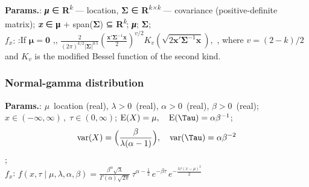    {\color{darkblue} \textbf{Params.}:} {\textbf{\textit{μ}} ∈ \textbf{R}\textsuperscript{\textit{k}} — location, \textbf{Σ} ∈ \textbf{R}\textsuperscript{\textit{k×k}} — covariance (positive-definite matrix)}; {\textbf{\textit{x}} ∈ \textbf{μ} + span(\textbf{Σ}) ⊆ \textbf{R}\textsuperscript{\textit{k}}}; {\textbf{\textit{μ}}}; {\textbf{Σ}};\hspace{0.5cm}\\{\color{darkblue} \textbf{$f_x$}:} {:If $\boldsymbol\mu = \mathbf{0}$ ,,  $\frac 2 {(2\pi)^{k/2} |\boldsymbol\Sigma|^{0.5}} \left( \frac {\mathbf{x}'\boldsymbol\Sigma^{-1} \mathbf{x}}{2} \right)^{v/2} K_v \left(\sqrt{2\mathbf{x}'\boldsymbol\Sigma^{-1} \mathbf{x}} \right), $ , where $v = (2 - k) / 2$ and $K_v$ is the modified Bessel function of the second kind.}



    
        
\subsubsection{Normal-gamma distribution}





    {\color{darkblue} \textbf{Params.}:} {$\mu\,$ location (real),  $\lambda > 0\,$ (real),  $\alpha > 0\,$ (real),  $\beta > 0\,$ (real)}; {$x \in (-\infty, \infty)\,\!, \; \tau \in (0,\infty)$}; {$\operatorname{E}(X)=\mu\,\! ,\quad \operatorname{E}(\Tau)= \alpha \beta^{-1}$}; {$$\operatorname{var}(X)= \Big(\frac{\beta}{\lambda (\alpha-1)}\Big) ,\quad 
\operatorname{var}(\Tau)=\alpha \beta^{-2}$$};\hspace{0.5cm}\\{\color{darkblue} \textbf{$f_x$}:} {$f(x,\tau\mid\mu,\lambda,\alpha,\beta) = \frac{\beta^\alpha \sqrt{\lambda}}{\Gamma(\alpha)\sqrt{2\pi}}  \, \tau^{\alpha-\frac{1}{2}}\,e^{-\beta\tau}\,e^{ -\frac{ \lambda \tau (x- \mu)^2}{2}}$}



